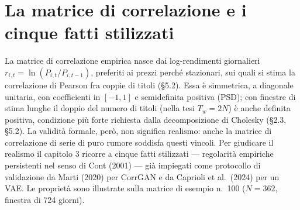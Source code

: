 \section{La matrice di correlazione e i cinque fatti stilizzati}

La matrice di correlazione empirica nasce dai log-rendimenti giornalieri $r_{i,t} = \ln(P_{i,t}/P_{i,t-1})$, preferiti ai prezzi perché stazionari, sui quali si stima la correlazione di Pearson fra coppie di titoli (\S5.2). Essa è simmetrica, a diagonale unitaria, con coefficienti in $[-1, 1]$ e semidefinita positiva (PSD); con finestre di stima lunghe il doppio del numero di titoli (nella tesi $T_w = 2N$) è anche definita positiva, condizione più forte richiesta dalla decomposizione di Cholesky (\S2.3, \S5.2). La validità formale, però, non significa realismo: anche la matrice di correlazione di serie di puro rumore soddisfa questi vincoli. Per giudicare il realismo il capitolo 3 ricorre a cinque fatti stilizzati --- regolarità empiriche persistenti nel senso di Cont (2001) --- già impiegati come protocollo di validazione da Marti (2020) per CorrGAN e da Caprioli et al.\ (2024) per un VAE. Le proprietà sono illustrate sulla matrice di esempio n.~100 ($N = 362$, finestra di 724 giorni).


